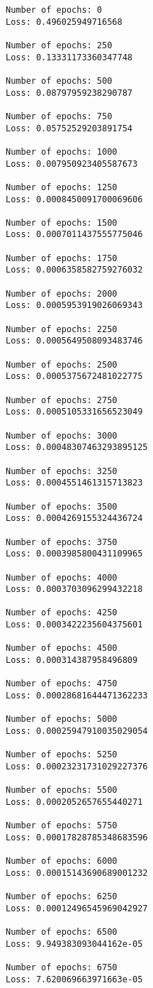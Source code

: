 \documentclass[11pt]{article}
\begin{document}
    \begin{Verbatim}[commandchars=\\\{\}]
Number of epochs: 0
Loss: 0.496025949716568

Number of epochs: 250
Loss: 0.13331173360347748

Number of epochs: 500
Loss: 0.08797959238290787

Number of epochs: 750
Loss: 0.05752529203891754

Number of epochs: 1000
Loss: 0.007950923405587673

Number of epochs: 1250
Loss: 0.0008450091700069606

Number of epochs: 1500
Loss: 0.0007011437555775046

Number of epochs: 1750
Loss: 0.0006358582759276032

Number of epochs: 2000
Loss: 0.0005953919026069343

Number of epochs: 2250
Loss: 0.0005649508093483746

Number of epochs: 2500
Loss: 0.0005375672481022775

Number of epochs: 2750
Loss: 0.0005105331656523049

Number of epochs: 3000
Loss: 0.00048307463293895125

Number of epochs: 3250
Loss: 0.0004551461315713823

Number of epochs: 3500
Loss: 0.0004269155324436724

Number of epochs: 3750
Loss: 0.0003985800431109965

Number of epochs: 4000
Loss: 0.0003703096299432218

Number of epochs: 4250
Loss: 0.0003422235604375601

Number of epochs: 4500
Loss: 0.000314387958496809

Number of epochs: 4750
Loss: 0.00028681644471362233

Number of epochs: 5000
Loss: 0.00025947910035029054

Number of epochs: 5250
Loss: 0.00023231731029227376

Number of epochs: 5500
Loss: 0.0002052657655440271

Number of epochs: 5750
Loss: 0.00017828785348683596

Number of epochs: 6000
Loss: 0.00015143690689001232

Number of epochs: 6250
Loss: 0.00012496545969042927

Number of epochs: 6500
Loss: 9.949383093044162e-05

Number of epochs: 6750
Loss: 7.620069663971663e-05


\end{Verbatim}
\end{document}
